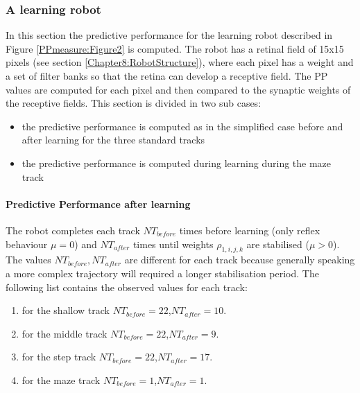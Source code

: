 \subsubsection{A learning robot}
In this section the predictive performance for the learning robot described in 
Figure \ref{PPmeasure:Figure2} is computed. 
The robot has a retinal field of 15x15 pixels (see section \ref{Chapter8:RobotStructure}), 
where each pixel has a weight and a set of filter banks so that the retina 
can develop a receptive field.
The PP values are computed for each pixel and then compared to the synaptic weights
of the receptive fields.
This section is divided in two sub cases:
\begin{itemize}
 \item the predictive performance is computed as in the simplified case before and after learning for the three standard tracks
 \item the predictive performance is computed during learning during the maze track
\end{itemize}

\paragraph{Predictive Performance after learning}
The robot completes each track $NT_{before}$ times before learning
(only reflex behaviour $\mu=0$) and $NT_{after}$ times until weights $\rho_{1,i,j,k}$
are stabilised ($\mu>0$).
The values $NT_{before},NT_{after}$ are different for each track because generally speaking
a more complex trajectory will required a longer stabilisation period.
The following list contains the observed values for each track:
\begin{enumerate}
\item for the shallow track $NT_{before}=22$,$NT_{after}=10$. 
\item for the middle track $NT_{before}=22$,$NT_{after}=9$. 
\item for the step track $NT_{before}=22$,$NT_{after}=17$. 
\item for the maze track $NT_{before}=1$,$NT_{after}=1$.
\end{enumerate}


